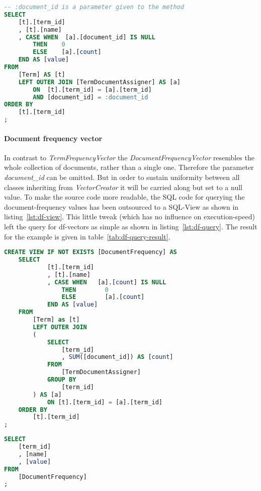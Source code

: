 \begin{lstlisting}[language=SQL,caption={SQL query for generating tf-vectors},label={lst:tf-query},float=h]
-- :document_id is a parameter given to the method
SELECT
    [t].[term_id]
    , [t].[name]
    , CASE WHEN  [a].[document_id] IS NULL
        THEN    0
        ELSE    [a].[count]
    END AS [value]
FROM
    [Term] AS [t]
    LEFT OUTER JOIN [TermDocumentAssigner] AS [a]
        ON  [t].[term_id] = [a].[term_id]
        AND [document_id] = :document_id
ORDER BY
    [t].[term_id]
;
\end{lstlisting}

\FloatBarrier

\paragraph{Document frequency vector}
In contrast to \textit{TermFrequencyVector} the \textit{DocumentFrequencyVector} resembles the whole collection of documents, rather than a single one.
Therefore the parameter \textit{document\_id} can be omitted.
But in order to sustain uniformity between all classes inheriting from \textit{VectorCreator} it will be carried along but set to a null value.
To make the source code more readable, the SQL code for querying the document-frequency values has been outsourced to a SQL-View as shown in listing~\ref{lst:df-view}.
This little tweak (which has no influence on execution-speed) left the query for df-vectors as simple as shown in listing~\ref{lst:df-query}.
The result for the example is given in table~\ref{tab:df-query-result}.

\begin{lstlisting}[language=SQL,caption={SQL statement to create the \textit{DocumentFrequency}-view},label={lst:df-view},float=h]
CREATE VIEW IF NOT EXISTS [DocumentFrequency] AS
    SELECT
            [t].[term_id]
            , [t].[name]
            , CASE WHEN   [a].[count] IS NULL
                THEN        0
                ELSE        [a].[count]
            END AS [value]
    FROM
        [Term] as [t]
        LEFT OUTER JOIN
        (
            SELECT
                [term_id]
                , SUM([document_id]) AS [count]
            FROM
                [TermDocumentAssigner]
            GROUP BY
                [term_id]
        ) AS [a]
            ON [t].[term_id] = [a].[term_id]
    ORDER BY
        [t].[term_id]
;
\end{lstlisting}

\begin{lstlisting}[language=SQL,caption={SQL query for generating df-vectors},label={lst:df-query},float=h]
SELECT
    [term_id]
    , [name]
    , [value]
FROM
    [DocumentFrequency]
;
\end{lstlisting}

